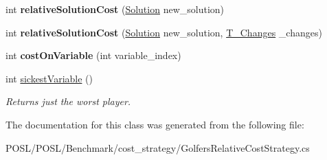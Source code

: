 \begin{DoxyCompactItemize}
int {\bfseries relative\+Solution\+Cost} (\hyperlink{classPOSL_1_1Data_1_1Solution}{Solution} new\+\_\+solution)
\item 
\mbox{\label{classPOSL_1_1Benchmarks_1_1GolfersRelativeCostStrategy_a7955b5a608662c7a39684896f8475e8f}} 
int {\bfseries relative\+Solution\+Cost} (\hyperlink{classPOSL_1_1Data_1_1Solution}{Solution} new\+\_\+solution, \hyperlink{structPOSL_1_1Tools_1_1T__Changes}{T\+\_\+\+Changes} \+\_\+changes)
\item 
\mbox{\label{classPOSL_1_1Benchmarks_1_1GolfersRelativeCostStrategy_a168f0a51067b3953c29d02b15f1b481d}} 
int {\bfseries cost\+On\+Variable} (int variable\+\_\+index)
\item 
\mbox{\label{classPOSL_1_1Benchmarks_1_1GolfersRelativeCostStrategy_a7662cbfa217153ef577767bbea22b559}} 
int \hyperlink{classPOSL_1_1Benchmarks_1_1GolfersRelativeCostStrategy_a7662cbfa217153ef577767bbea22b559}{sickest\+Variable} ()
\begin{DoxyCompactList}\small\item\em Returns just the worst player. \end{DoxyCompactList}\end{DoxyCompactItemize}


The documentation for this class was generated from the following file\+:\begin{DoxyCompactItemize}
\item 
P\+O\+S\+L/\+P\+O\+S\+L/\+Benchmark/cost\+\_\+strategy/Golfers\+Relative\+Cost\+Strategy.\+cs\end{DoxyCompactItemize}
